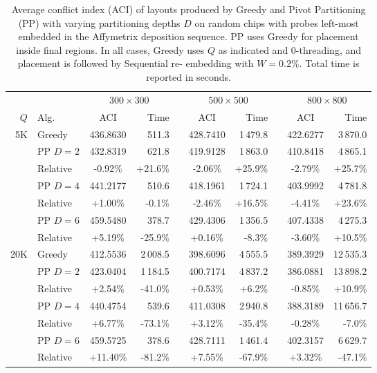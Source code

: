\begin{table}[t!]\centering
\caption{\label{tab:pp_async_ci}
  Average conflict index (ACI) of layouts produced by Greedy and Pivot
  Partitioning (PP) with varying partitioning depths $D$ on random chips with
  probes left-most embedded in the Affymetrix deposition sequence. PP uses
  Greedy for placement inside final regions. In all cases, Greedy uses $Q$ as
  indicated and $0$-threading, and placement is followed by Sequential
  re- embedding with $W=0.2\%$. Total time is reported in seconds.}
\footnotesize{
\begin{tabular}{rlcrlcrlcr}
\vspace{1pt}
 & & \multicolumn{2}{c}{$300\times 300$} & & \multicolumn{2}{c}{$500\times 500$} & & \multicolumn{2}{c}{$800\times 800$} \\
\cline{3-4} \cline{6-7} \cline{9-10}
\vspace{1pt}
$Q$ & Alg.     & ACI      & Time       & & ACI      & Time       & & ACI      & Time        \\
\hline
 5K & Greedy   & 436.8630 &    511.3   & & 428.7410 & 1\,479.8   & & 422.6277 &  3\,870.0   \\
\cline{2-10}
    & PP $D=2$ & 432.8319 &    621.8   & & 419.9128 & 1\,863.0   & & 410.8418 &  4\,865.1   \\
    & Relative &  -0.92\% &    +21.6\% & &  -2.06\% &    +25.9\% & &  -2.79\% &     +25.7\% \\
\cline{2-10}
    & PP $D=4$ & 441.2177 &    510.6   & & 418.1961 & 1\,724.1   & & 403.9992 &  4\,781.8   \\
    & Relative &  +1.00\% &     -0.1\% & &  -2.46\% &    +16.5\% & &  -4.41\% &     +23.6\% \\
\cline{2-10}
    & PP $D=6$ & 459.5480 &    378.7   & & 429.4306 & 1\,356.5   & & 407.4338 &  4\,275.3   \\
    & Relative &  +5.19\% &    -25.9\% & &  +0.16\% &     -8.3\% & &  -3.60\% &     +10.5\% \\
\hline
20K & Greedy   & 412.5536 & 2\,008.5   & & 398.6096 & 4\,555.5   & & 389.3929 & 12\,535.3   \\
\cline{2-10}
    & PP $D=2$ & 423.0404 & 1\,184.5   & & 400.7174 & 4\,837.2   & & 386.0881 & 13\,898.2   \\
    & Relative &  +2.54\% &    -41.0\% & &  +0.53\% &     +6.2\% & &  -0.85\% &     +10.9\% \\
\cline{2-10}
    & PP $D=4$ & 440.4754 &    539.6   & & 411.0308 & 2\,940.8   & & 388.3189 & 11\,656.7   \\
    & Relative &  +6.77\% &    -73.1\% & &  +3.12\% &    -35.4\% & &  -0.28\% &      -7.0\% \\
\cline{2-10}
    & PP $D=6$ & 459.5725 &    378.6   & & 428.7111 & 1\,461.4   & & 402.3157 &  6\,629.7   \\
    & Relative & +11.40\% &    -81.2\% & &  +7.55\% &    -67.9\% & &  +3.32\% &     -47.1\% \\
\hline
\end{tabular}}
\end{table}

